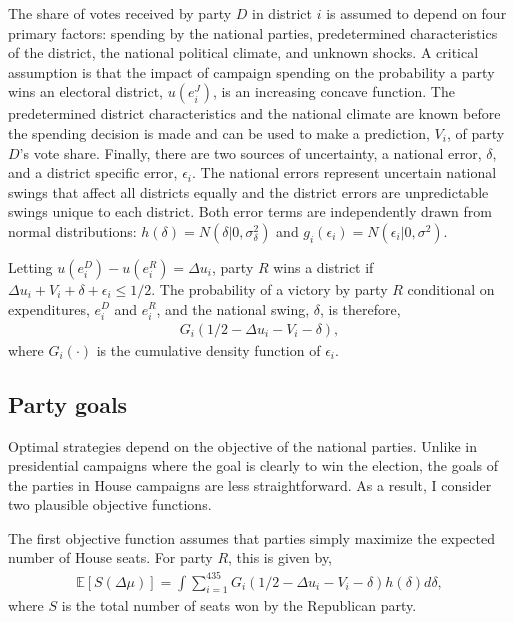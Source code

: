 \documentclass[12pt,final,fleqn]{article}
\theoremstyle{plain}
\newcommand\E{\mathbb{E}}
\begin{document}
The share of votes received by party $D$ in district $i$ is assumed to depend on four primary factors: spending by the national parties, predetermined characteristics of the district, the national political climate, and unknown shocks. A critical assumption is that the impact of campaign spending on the probability a party wins an electoral district, $u(e^J_i)$, is an increasing concave function. The predetermined district characteristics and the national climate are known before the spending decision is made and can be used to make a prediction, $V_i$, of party $D$'s vote share. Finally, there are two sources of uncertainty, a national error, $\delta$, and a district specific error, $\epsilon_i$. The national errors represent uncertain national swings that affect all districts equally and the district errors are unpredictable swings unique to each district. Both error terms are independently drawn from normal distributions: $h(\delta) = N(\delta|0, \sigma^2_\delta)$ and $g_i(\epsilon_i) = N(\epsilon_i|0, \sigma^2)$. 

Letting $u(e^D_i) - u(e^R_i) = \Delta u_i$, party $R$ wins a district if $\Delta u_i + V_i + \delta + \epsilon_i \leq 1/2$. The probability of a victory by party $R$ conditional on expenditures, $e^D_i$ and $e^R_i$, and the national swing, $\delta$, is therefore,
\begin{align}\label{eqn: Republican wins}
G_i(1/2 - \Delta u_i - V_i - \delta),
\end{align}
where $G_i(\cdot)$ is the cumulative density function of $\epsilon_i$. 

\subsection{Party goals}
Optimal strategies depend on the objective of the national parties. Unlike in presidential campaigns where the goal is clearly to win the election, the goals of the parties in House campaigns are less straightforward. As a result, I consider two plausible objective functions. 

The first objective function assumes that parties simply maximize the expected number of House seats. For party $R$, this is given by,
\begin{align} \label{eqn: expected number of seats}
\E\left[S (\Delta \mu)\right] = \int \sum_{i=1}^{435} G_i(1/2 - \Delta u_i - V_i - \delta)h(\delta) d\delta,
\end{align}
where $S$ is the total number of seats won by the Republican party. 
\end{document}

